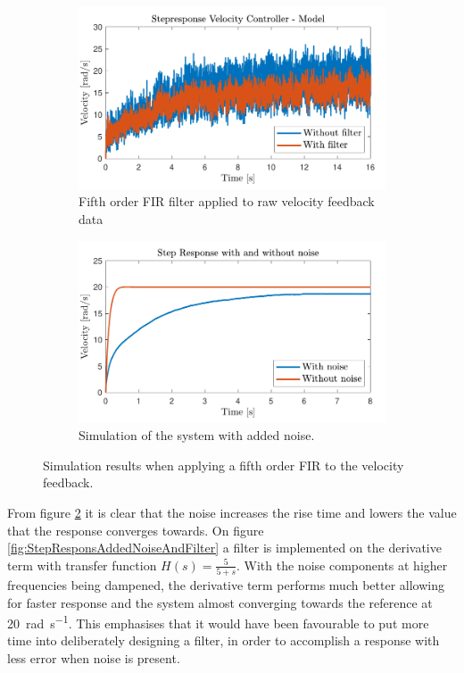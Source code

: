 \documentclass[../../main.tex]{subfiles}
\begin{document}
\begin{figure}[H]
     \centering
     \begin{subfigure}[b]{0.49\textwidth}
         \centering
    \includegraphics[width=\textwidth]{Sections/Miscellaneous/Images/FilteredStepRespons5Order.pdf}
    \caption{Fifth order FIR filter applied to raw velocity feedback data}
    \label{fig:FilteredStepRespons5Order}
     \end{subfigure}
     \hfill
     \begin{subfigure}[b]{0.49\textwidth}
         \centering
         \includegraphics[width=\textwidth]{Sections/Miscellaneous/Images/StepResponsAddedNoise.pdf}
         \caption{Simulation of the system with added noise.}
         \label{fig:StepResponsAddedNoise}
     \end{subfigure}
        \caption{Simulation results when applying a fifth order FIR to the velocity feedback.}
        \label{fig:FilterDiskussionImplementedFilter}
\end{figure}
From figure \ref{fig:StepResponsAddedNoise} it is clear that the noise increases the rise time and lowers the value that the response converges towards. On figure \ref{fig:StepResponsAddedNoiseAndFilter} a filter is implemented on the derivative term with transfer function $H(s) = \frac{5}{5+s}$. With the noise components at higher frequencies being dampened, the derivative term performs much better allowing for faster response and the system almost converging towards the reference at \SI{20}{\radian \per \second}. This emphasises that it would have been favourable to put more time into deliberately designing a filter, in order to accomplish a response with less error when noise is present.
\end{document}
